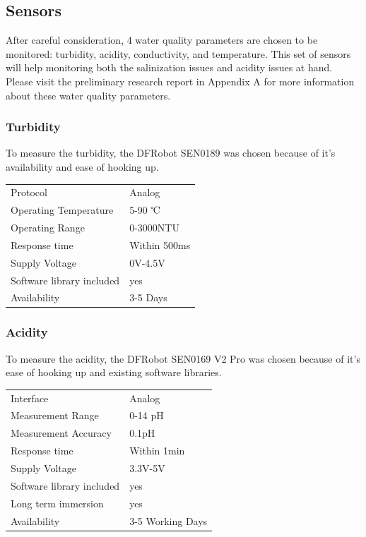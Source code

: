 \newpage
\subsection{Sensors}
After careful consideration, 4 water quality parameters are chosen to be monitored: turbidity, acidity, conductivity, and temperature. This set of sensors will help monitoring both the salinization issues and acidity issues at hand. Please visit the preliminary research report in Appendix A \cite{prr} for more information about these water quality parameters.

\subsubsection{Turbidity}
To measure the turbidity, the DFRobot SEN0189 \cite{SEN0189} was chosen because of it's availability and ease of hooking up.
\begin{table}[h!]
	\centering
	\quad
	\begin{tabular}{| l | l |}
    \hline
    Protocol & Analog\\
    Operating Temperature & 5-90 ℃ \\
    Operating Range &  0-3000NTU\\
    Response time & Within 500ms \\
    Supply Voltage & 0V-4.5V \\
    Software library included & yes \\
    Availability & 3-5 Days \\
    \hline
	\end{tabular}
\end{table}

\subsubsection{Acidity}
To measure the acidity, the DFRobot SEN0169 V2 Pro \cite{SEN0169V2} was chosen because of it's ease of hooking up and existing software libraries.
\begin{table}[h!]
	\centering
	\quad
	\begin{tabular}{| l | l |}
    \hline
    Interface & Analog \\
    Measurement Range & 0-14 pH \\
    Measurement Accuracy &  0.1pH \\
    Response time & Within 1\gls{min} \\
    Supply Voltage & 3.3V-5V \\
    Software library included & yes \\
    Long term immersion & yes \\
    Availability & 3-5 Working Days \\
    \hline
	\end{tabular}
\end{table}

